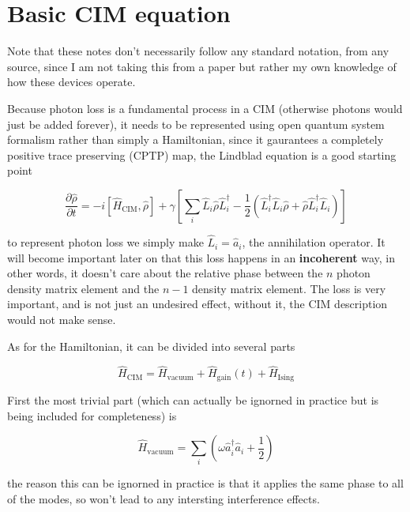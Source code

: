 \documentclass[english]{article}
\begin{document}
\section*{Basic CIM equation}

Note that these notes don't necessarily follow any standard notation, from any source,  since I am not taking this from a paper but rather my own knowledge of how these devices operate.

Because photon loss is a fundamental process in a CIM (otherwise photons would just be added forever), it needs to be represented using open quantum system formalism rather than simply a Hamiltonian,  since it gaurantees a completely positive trace preserving (CPTP) map, the Lindblad equation is a good starting point 

\begin{equation}
\frac{\partial \hat{\rho}}{\partial t}=-i[\hat{H}_\mathrm{CIM},\hat{\rho}]+\gamma \left[\sum_i\hat{L}_i\hat{\rho} \hat{L}^\dagger_i-\frac{1}{2}(\hat{L}^\dagger_i\hat{L}_i\hat{\rho}+\hat{\rho}\hat{L}^\dagger_i\hat{L}_i)\right]
\end{equation}

to represent photon loss we simply make $\hat{L}_i=\hat{a}_i$, the annihilation operator.  It will become important later on that this loss happens in an \textbf{incoherent} way, in other words, it doesn't care about the relative phase between the $n$
photon density matrix element and the $n-1$ density matrix element. The loss is very important, and is not just an undesired effect, without it, the CIM description would not make sense.

As for the Hamiltonian, it can be divided into several parts

\begin{equation}
\hat{H}_\mathrm{CIM}=\hat{H}_\mathrm{vacuum}+\hat{H}_\mathrm{gain}(t)+\hat{H}_\mathrm{Ising}
\end{equation}

First the most trivial part (which can actually be ignorned in practice but is being included for completeness) is 

\begin{equation}
\hat{H}_\mathrm{vacuum}=\sum_i (\omega \hat{a}_i^\dagger\hat{a}_i+\frac{1}{2})
\end{equation}

the reason this can be ignorned in practice is that it applies the same phase to all of the modes, so won't lead to any intersting interference effects.
\end{document}
